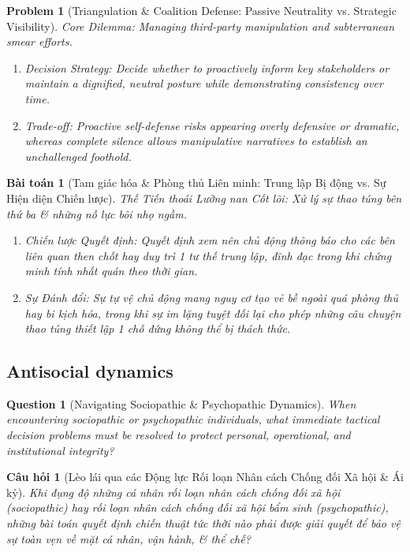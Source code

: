 \documentclass{article}
\newtheorem{problem}{Problem}
\newtheorem{question}{Question}
\newtheorem{baitoan}{Bài toán}
\newtheorem{cauhoi}{Câu hỏi}
\begin{document}
\begin{problem}[Triangulation \& Coalition Defense: Passive Neutrality vs. Strategic Visibility]
	\emph{Core Dilemma:} Managing third-party manipulation and subterranean smear efforts.
	\begin{enumerate}[label=(\roman*)]
		\item \emph{Decision Strategy:} Decide whether to proactively inform key stakeholders or maintain a dignified, neutral posture while demonstrating consistency over time.
		\item \emph{Trade-off:} Proactive self-defense risks appearing overly defensive or dramatic, whereas complete silence allows manipulative narratives to establish an unchallenged foothold.
	\end{enumerate}
\end{problem}
\begin{baitoan}[Tam giác hóa \& Phòng thủ Liên minh: Trung lập Bị động vs. Sự Hiện diện Chiến lược]
	\emph{Thế Tiến thoái Lưỡng nan Cốt lõi:} Xử lý sự thao túng bên thứ ba \& những nỗ lực bôi nhọ ngầm.
	\begin{enumerate}[label=(\roman*)]
		\item \emph{Chiến lược Quyết định:} Quyết định xem nên chủ động thông báo cho các bên liên quan then chốt hay duy trì 1 tư thế trung lập, đĩnh đạc trong khi chứng minh tính nhất quán theo thời gian.
		\item \emph{Sự Đánh đổi:} Sự tự vệ chủ động mang nguy cơ tạo vẻ bề ngoài quá phòng thủ hay bi kịch hóa, trong khi sự im lặng tuyệt đối lại cho phép những câu chuyện thao túng thiết lập 1 chỗ đứng không thể bị thách thức.
	\end{enumerate}
\end{baitoan}

\subsection{Antisocial dynamics}

\begin{question}[Navigating Sociopathic \& Psychopathic Dynamics]
	When encountering sociopathic or psychopathic individuals, what immediate tactical decision problems must be resolved to protect personal, operational, and institutional integrity?
\end{question}
\begin{cauhoi}[Lèo lái qua các Động lực Rối loạn Nhân cách Chống đối Xã hội \& Ái kỷ]
	Khi đụng độ những cá nhân rối loạn nhân cách chống đối xã hội (sociopathic) hay rối loạn nhân cách chống đối xã hội bẩm sinh (psychopathic), những bài toán quyết định chiến thuật tức thời nào phải được giải quyết để bảo vệ sự toàn vẹn về mặt cá nhân, vận hành, \& thể chế?
\end{cauhoi}
\end{document}
